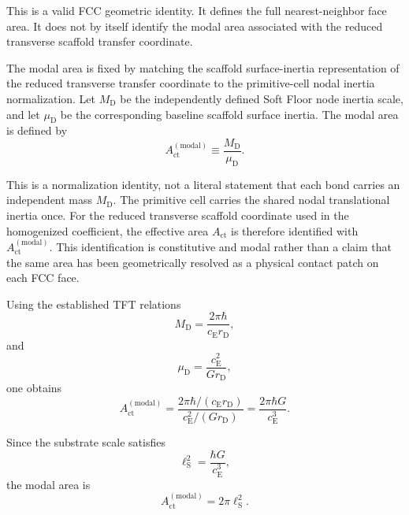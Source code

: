 This is a valid FCC geometric identity. It defines the full nearest-neighbor face area. It does not by itself identify the modal area associated with the reduced transverse scaffold transfer coordinate.

The modal area is fixed by matching the scaffold surface-inertia representation of the reduced transverse transfer coordinate to the primitive-cell nodal inertia normalization. Let $M_{\mathrm{D}}$ be the independently defined Soft Floor node inertia scale, and let $\mu_{\mathrm{D}}$ be the corresponding baseline scaffold surface inertia. The modal area is defined by
\begin{equation}
    A_{\mathrm{ct}}^{(\mathrm{modal})} \equiv \frac{M_{\mathrm{D}}}{\mu_{\mathrm{D}}}.
\end{equation}

This is a normalization identity, not a literal statement that each bond carries an independent mass $M_{\mathrm{D}}$. The primitive cell carries the shared nodal translational inertia once. For the reduced transverse scaffold coordinate used in the homogenized coefficient, the effective area $A_{\mathrm{ct}}$ is therefore identified with $A_{\mathrm{ct}}^{(\mathrm{modal})}$. This identification is constitutive and modal rather than a claim that the same area has been geometrically resolved as a physical contact patch on each FCC face.

Using the established TFT relations
\begin{equation}
    M_{\mathrm{D}} = \frac{2\pi\hbar}{c_{\mathrm{E}}r_{\mathrm{D}}},
\end{equation}
and
\begin{equation}
    \mu_{\mathrm{D}} = \frac{c_{\mathrm{E}}^2}{G r_{\mathrm{D}}},
\end{equation}
one obtains
\begin{equation}
    A_{\mathrm{ct}}^{(\mathrm{modal})} = \frac{2\pi\hbar/(c_{\mathrm{E}}r_{\mathrm{D}})}{c_{\mathrm{E}}^2/(G r_{\mathrm{D}})} = \frac{2\pi\hbar G}{c_{\mathrm{E}}^3}.
\end{equation}

Since the substrate scale satisfies
\begin{equation}
    \ell_{\mathrm{S}}^2 = \frac{\hbar G}{c_{\mathrm{E}}^3},
\end{equation}
the modal area is
\begin{equation}
    A_{\mathrm{ct}}^{(\mathrm{modal})} = 2\pi\ell_{\mathrm{S}}^2.
\end{equation}

